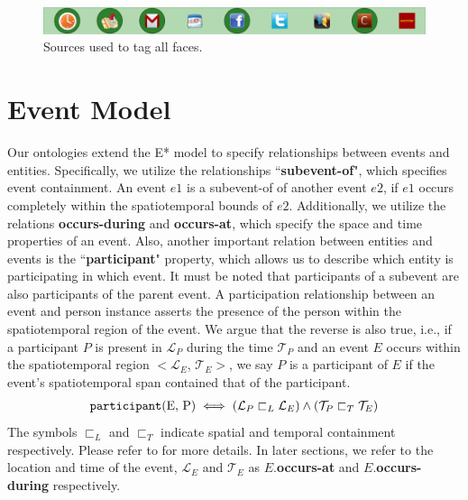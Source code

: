 \begin{figure}[h!]
\centering
\includegraphics[width=\textwidth]{media/chapter4/stacktrace/vldb-source-3.png}
\caption{Sources used to tag all faces.}
\label{fig:vldb-network-3}
\end{figure}


\section{Event Model}
Our ontologies extend the E* model\cite{gupta2011managing} to specify relationships between events and entities. Specifically, we utilize the relationships ``\textbf{subevent-of}", which specifies event containment. An event $e1$ is a subevent-of of another event $e2$, if $e1$ occurs completely within the spatiotemporal bounds of $e2$. Additionally, we utilize the relations \textbf{occurs-during} and \textbf{occurs-at}, which specify the space and time properties of an event. Also, another important relation between entities and events is the ``\textbf{participant}" property, which allows us to describe which entity is participating in which event. It must be noted that participants of a subevent are also participants of the parent event. A participation relationship between an event and person instance asserts the presence of the person within the spatiotemporal region of the event. We argue that the reverse is also true, i.e., if a participant $P$ is present in $\mathcal{L}_P$ during the time $\mathcal{T}_P$ and an event $E$ occurs within the spatiotemporal region $<\mathcal{L}_E$, $\mathcal{T}_E>$, we say $P$ is a participant of $E$ if the event's spatiotemporal span contained that of the participant.
\begin{equation}
\label{eq:participation-region}
\begin{aligned}
\text{\texttt{participant}(E, P)} \iff (\mathcal{L}_P \sqsubset_L \mathcal{L}_E) \wedge (\mathcal{T}_P \sqsubset_T \mathcal{T}_E)
\end{aligned}
\end{equation}
The symbols $\sqsubset_L$ and $\sqsubset_T$ indicate spatial and temporal containment respectively. Please refer to \cite{gupta2011managing} for more details. In later sections, we refer to the location and time of the event, $\mathcal{L}_E$ and $\mathcal{T}_E$ as $E$.\textbf{occurs-at} and $E.$\textbf{occurs-during} respectively. 


